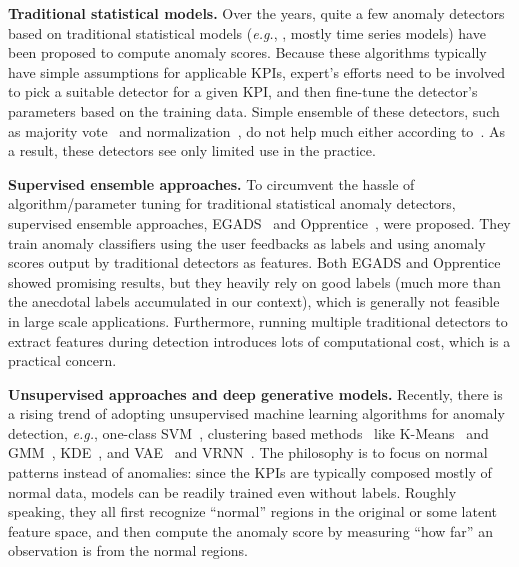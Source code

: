 \documentclass[sigconf]{acmart}
\newcommand{\EG}{\textit{e.g.}}
\begin{document}
\textbf{Traditional statistical models.} Over the years, quite a few anomaly detectors based on traditional statistical models (\textit{e.g.}, \cite{historical-avg,MA,arma,arima,kalman,holt-winters,TSD,svd,wavelet}, mostly time series models) have been proposed to compute anomaly scores. Because these algorithms typically have simple assumptions for applicable KPIs,  expert's efforts need to be involved to pick a suitable detector for a given KPI, and then fine-tune the detector's parameters based on the training data.  Simple ensemble of these detectors, such as majority vote~\cite{majority_vote} and normalization~\cite{normalization_schema}, do not help much either according to~\cite{opprentice}. As a result, these detectors see only limited use in the practice.


\textbf{Supervised ensemble approaches.}
To circumvent the hassle of algorithm/parameter tuning for traditional statistical anomaly detectors, supervised ensemble approaches, EGADS~\cite{egads} and Opprentice~\cite{opprentice}, were proposed. They train anomaly classifiers using the user feedbacks as labels and using anomaly scores output by traditional detectors as features. Both EGADS and Opprentice showed promising results, but they heavily rely on good labels (much more than the anecdotal labels accumulated in our context), which is generally not feasible in large scale applications. Furthermore, running multiple traditional detectors to extract features during detection introduces lots of computational cost, which is a practical concern.

\textbf{Unsupervised approaches and deep generative models.}
Recently, there is a rising trend of adopting unsupervised machine learning algorithms for anomaly detection, \EG, one-class SVM~\cite{one-class-svm1,deep-learning-svm}, clustering based methods~\cite{cluster} like K-Means~\cite{k-means} and GMM~\cite{GMM}, KDE~\cite{kde}, and VAE~\cite{vae-ad} and VRNN~\cite{vi-storn}. The philosophy is to focus on normal patterns instead of anomalies: since the KPIs are typically composed mostly of normal data, models can be readily trained even without labels.
Roughly speaking, they all first recognize ``normal'' regions in the original or some latent feature space, and  then compute the anomaly score by measuring ``how far'' an observation is from the normal regions.
\end{document}
